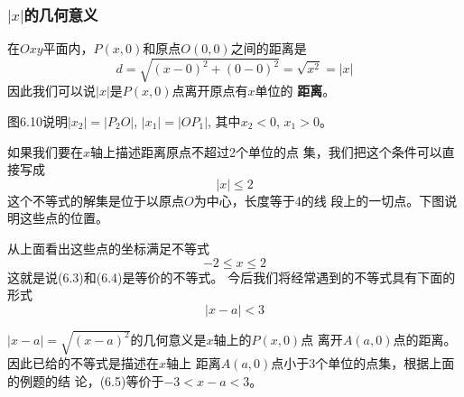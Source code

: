 \subsubsection{$|x|$的几何意义}
在$Oxy$平面内，$P(x,0)$和原点$O(0,0)$之间的距离是
\[d=\sqrt{(x-0)^2+(0-0)^2}=\sqrt{x^2}=|x|\]
因此我们可以说$|x|$是$P(x,0)$点离开原点有$x$单位的
\textbf{距离}。

图6.10说明$|x_2|=|P_2O|$, $|x_1|=|OP_1|$, 其中$x_2<0$,
$x_1>0$。
\begin{figure}[htp]
    \centering
    \caption{}
\end{figure}

如果我们要在$x$轴上描述距离原点不超过2个单位的点
集，我们把这个条件可以直接写成
\begin{equation}
    |x|\le 2
\end{equation}
这个不等式的解集是位于以原点$O$为中心，长度等于4的线
段上的一切点。下图说明这些点的位置。
\begin{figure}[htp]
    \centering
{}
    \caption{}
\end{figure}

从上面看出这些点的坐标满足不等式
\begin{equation}
    -2\le x\le 2
\end{equation}
这就是说(6.3)和(6.4)是等价的不等式。
今后我们将经常遇到的不等式具有下面的形式
\begin{equation}
    |x-a|<3
\end{equation}

$|x-a|=\sqrt{(x-a)^2}$的几何意义是$x$轴上的$P(x,0)$点
离开$A(a,0)$点的距离。因此已给的不等式是描述在$x$轴上
距离$A(a,0)$点小于3个单位的点集，根据上面的例题的结
论，(6.5)等价于$-3<x-a<3$。

